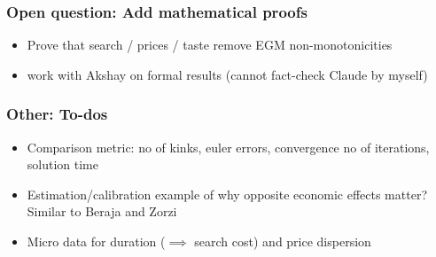\documentclass[aspectratio=169]{beamer}
\begin{document}
\begin{frame}[label = OpenTheory]
	\frametitle{Open question: Add mathematical proofs}
    \begin{itemize}\setlength\itemsep{0.9em}
        \item Prove that search / prices / taste remove EGM non-monotonicities
        \item work with Akshay on formal results (cannot fact-check Claude by myself)
    \end{itemize}
\end{frame}

\begin{frame}[label = Todo]
	\frametitle{Other: To-dos}
	\begin{itemize}\setlength\itemsep{0.9em}
		\item Comparison metric: no of kinks, euler errors, convergence no of iterations, solution time
		\item Estimation/calibration example of why opposite economic effects matter? Similar to Beraja and Zorzi
		\item Micro data for duration ($\implies$ search cost) and price dispersion
	\end{itemize}
\end{frame}

\end{document}
